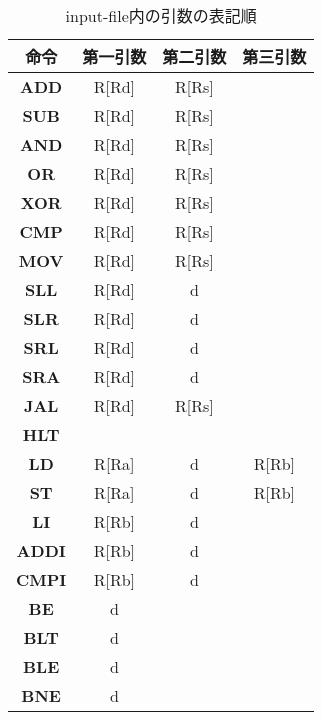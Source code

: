 \documentclass[11pt,a4j]{jarticle}%
\begin{document}
\begin{table}[htbp]
\centering
\caption{input-file内の引数の表記順}
\begin{tabular}{|c|c|c|c|}
\hline
\textbf{命令}  & \textbf{第一引数} & \textbf{第二引数} & \textbf{第三引数} \\ \hline
\textbf{ADD} & R{[}Rd{]}     & R{[}Rs{]}     &               \\ \hline
\textbf{SUB} & R{[}Rd{]}     & R{[}Rs{]}     &               \\ \hline
\textbf{AND} & R{[}Rd{]}     & R{[}Rs{]}     &               \\ \hline
\textbf{OR}  & R{[}Rd{]}     & R{[}Rs{]}     &               \\ \hline
\textbf{XOR} & R{[}Rd{]}     & R{[}Rs{]}     &               \\ \hline
\textbf{CMP} & R{[}Rd{]}     & R{[}Rs{]}     &               \\ \hline
\textbf{MOV} & R{[}Rd{]}     & R{[}Rs{]}     &               \\ \hline
\textbf{SLL} & R{[}Rd{]}     & d             &               \\ \hline
\textbf{SLR} & R{[}Rd{]}     & d             &               \\ \hline
\textbf{SRL} & R{[}Rd{]}     & d             &               \\ \hline
\textbf{SRA} & R{[}Rd{]}     & d             &               \\ \hline
\textbf{JAL} & R{[}Rd{]}     & R{[}Rs{]}     &               \\ \hline
\textbf{HLT} &            &               &               \\ \hline
\textbf{LD}  & R{[}Ra{]}     & d             & R{[}Rb{]}     \\ \hline
\textbf{ST}  & R{[}Ra{]}     & d             & R{[}Rb{]}     \\ \hline
\textbf{LI}  & R{[}Rb{]}     & d             &               \\ \hline
\textbf{ADDI}& R{[}Rb{]}     & d             &               \\ \hline
\textbf{CMPI}& R{[}Rb{]}     & d             &               \\ \hline
\textbf{BE}  & d             &               &               \\ \hline
\textbf{BLT} & d             &               &               \\ \hline
\textbf{BLE} & d             &               &               \\ \hline
\textbf{BNE} & d             &               &               \\ \hline
\end{tabular}
\end{table}
\end{document}
